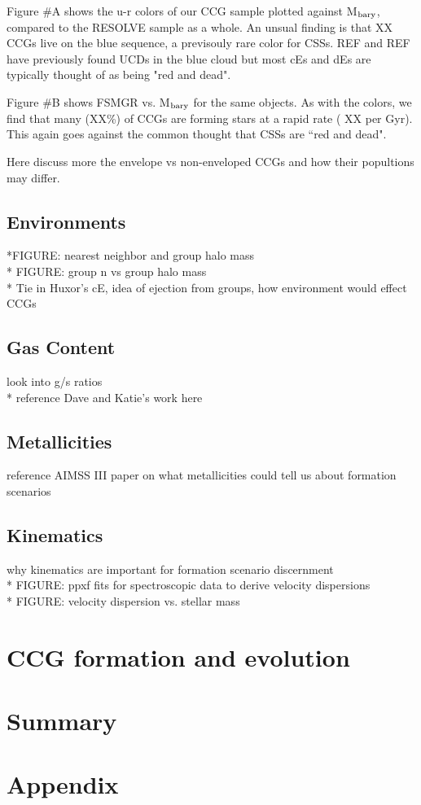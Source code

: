\documentclass[iop,apj,twocolappendix]{emulateapj}
\begin{document}
\noindent Figure \#A shows the u-r colors of our CCG sample plotted against M$_{\rm bary}$, compared to the RESOLVE sample as a whole. An unsual finding is that XX CCGs live on the blue sequence, a previsouly rare color for CSSs. REF and REF have previously found UCDs in the blue cloud but most cEs and dEs are typically thought of as being "red and dead".

Figure \#B shows FSMGR vs. M$_{\rm bary}$ for the same objects. As with the colors, we find that many (XX\%) of CCGs are forming stars at a rapid rate ( XX per Gyr). This again goes against the common thought that CSSs are ``red and dead".

Here discuss more the envelope vs non-enveloped CCGs and how their popultions may differ.

\subsection{Environments}
\noindent 
 *FIGURE: nearest neighbor and group halo mass\\
* FIGURE: group n vs group halo mass  \\
* Tie in Huxor's cE, idea of ejection from groups, how environment would effect CCGs

\subsection{Gas Content}
\noindent * look into g/s ratios \\
* reference Dave and Katie's work here

\subsection{Metallicities}
\noindent * reference AIMSS III paper on what metallicities could tell us about formation scenarios

\subsection{Kinematics}
\noindent * why kinematics are important for formation scenario discernment\\
* FIGURE: ppxf fits for spectroscopic data to derive velocity dispersions \\
* FIGURE: velocity dispersion vs. stellar mass

\section{CCG formation and evolution} %



\section{Summary}






\section{Appendix}
\end{document}
